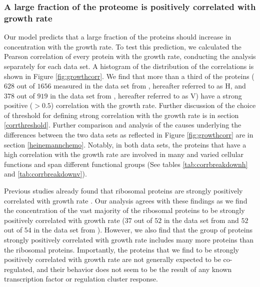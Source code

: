 \subsubsection{A large fraction of the proteome is positively correlated with growth rate}
Our model predicts that a large fraction of the proteins should increase in concentration with the growth rate.
To test this prediction, we calculated the Pearson correlation of every protein with the growth rate, conducting the analysis separately for each data set.
A histogram of the distribution of the correlations is shown in Figure \ref{fig:growthcorr}.
We find that more than a third of the proteins ($628$ out of $1656$ measured in the data set from \cite{Heinemann2015}, hereafter referred to as H, and $378$ out of $919$ in the data set from \cite{Valgepea2013}, hereafter referred to as V) have a strong positive ($>0.5$) correlation with the growth rate.
Further discussion of the choice of threshold for defining strong correlation with the growth rate is in section \ref{corrthreshold}.
Further comparison and analysis of the causes underlying the differences between the two data sets as reflected in Figure \ref{fig:growthcorr} are in section \ref{heinemannchemo}.
Notably, in both data sets, the proteins that have a high correlation with the growth rate are involved in many and varied cellular functions and span different functional groups (See tables \ref{tab:corrbreakdownh} and \ref{tab:corrbreakdownv}).

Previous studies already found that ribosomal proteins are strongly positively correlated with growth rate \cite{Pedersen1978a, ingraham1983growth, Klumpp2008}.
Our analysis agrees with these findings as we find the concentration of the vast majority of the ribosomal proteins to be strongly positively correlated with growth rate ($37$ out of $52$ in the data set from \cite{Heinemann2015} and $52$ out of $54$ in the data set from \cite{Valgepea2013}).
However, we also find that the group of proteins strongly positively correlated with growth rate includes many more proteins than the ribosomal proteins.
Importantly, the proteins that we find to be strongly positively correlated with growth rate are not generally expected to be co-regulated, and their behavior does not seem to be the result of any known transcription factor or regulation cluster response.